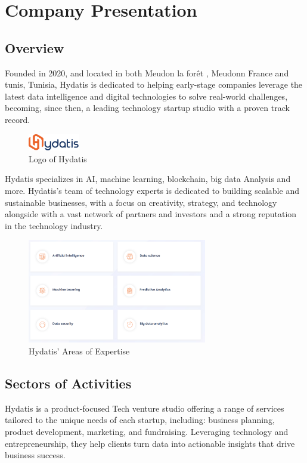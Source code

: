 \documentclass[12pt,a4paper,oneside,english]{book}
\begin{document}
{\chapter{Company Presentation} %

\label{ch:1er}
\section{Overview}
Founded in 2020, and located in both Meudon la forêt , Meudonn France and tunis, Tunisia, 
Hydatis is dedicated to helping early-stage companies leverage the latest data intelligence and digital technologies to solve real-world challenges, becoming, since then, a leading technology startup studio with a proven track record.
\begin{figure}[h!] %
    \centering
    \includegraphics[width=0.2\textwidth]{images/hydatiss.png}
    \caption{Logo of Hydatis}
    \label{fig:hydatis}
\end{figure}

Hydatis specializes in AI, machine learning, blockchain, big data Analysis and more. Hydatis's team of technology experts is dedicated to building scalable and sustainable businesses, with a focus on creativity, strategy, and technology alongside with a vast network of partners and investors and a strong reputation in the technology industry.
\begin{figure}[h!] %
    \centering
    \includegraphics[width=0.699\textwidth]{images/Expertise_hydatis.png}
    \caption{Hydatis' Areas of Expertise}
    \label{fig:Expertise_hydatis}
\end{figure}

\section{Sectors of Activities}%
Hydatis is a product-focused Tech venture studio offering a range of services tailored to the unique needs of each startup, including:
 business planning, product development, marketing, and fundraising. 
Leveraging technology and entrepreneurship, they help clients turn data into actionable insights that drive business success.
}
\end{document}
